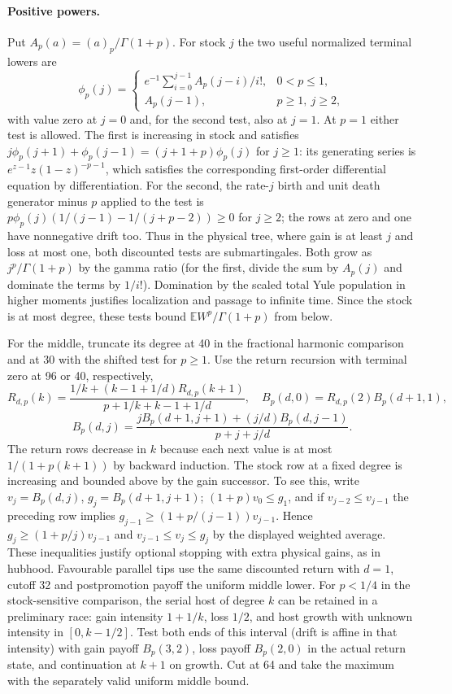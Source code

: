 \documentclass[11pt]{article}
\theoremstyle{remark}
\numberwithin{equation}{section}
\newcommand{\E}{\mathbb E}
\begin{document}
\paragraph{Positive powers.}
Put $A_p(a)=(a)_p/\Gamma(1+p)$. For stock $j$ the two useful normalized terminal lowers are
\[
 \phi_p(j)=\begin{cases}
 e^{-1}\sum_{i=0}^{j-1}A_p(j-i)/i!,&0<p\le1,\\
 A_p(j-1),&p\ge1,\ j\ge2,
 \end{cases}
\]
with value zero at $j=0$ and, for the second test, also at $j=1$. At $p=1$ either test is allowed. The first is increasing in stock and satisfies $j\phi_p(j+1)+\phi_p(j-1)=(j+1+p)\phi_p(j)$ for $j\ge1$: its generating series is $e^{z-1}z(1-z)^{-p-1}$, which satisfies the corresponding first-order differential equation by differentiation. For the second, the rate-$j$ birth and unit death generator minus $p$ applied to the test is $p\phi_p(j)(1/(j-1)-1/(j+p-2))\ge0$ for $j\ge2$; the rows at zero and one have nonnegative drift too. Thus in the physical tree, where gain is at least $j$ and loss at most one, both discounted tests are submartingales. Both grow as $j^p/\Gamma(1+p)$ by the gamma ratio (for the first, divide the sum by $A_p(j)$ and dominate the terms by $1/i!$). Domination by the scaled total Yule population in higher moments justifies localization and passage to infinite time. Since the stock is at most degree, these tests bound $\E W^p/\Gamma(1+p)$ from below.

For the middle, truncate its degree at 40 in the fractional harmonic comparison and at 30 with the shifted test for $p\ge1$. Use the return recursion with terminal zero at 96 or 40, respectively,
\[
 R_{d,p}(k)=\frac{1/k+(k-1+1/d)R_{d,p}(k+1)}{p+1/k+k-1+1/d},\quad
 B_p(d,0)=R_{d,p}(2) B_p(d+1,1),
\]
\[
 B_p(d,j)=\frac{j B_p(d+1,j+1)+(j/d)B_p(d,j-1)}{p+j+j/d}.
\]
The return rows decrease in $k$ because each next value is at most $1/(1+p(k+1))$ by backward induction. The stock row at a fixed degree is increasing and bounded above by the gain successor. To see this, write $v_j=B_p(d,j)$, $g_j=B_p(d+1,j+1)$; $(1+p)v_0\le g_1$, and if $v_{j-2}\le v_{j-1}$ the preceding row implies $g_{j-1}\ge(1+p/(j-1))v_{j-1}$. Hence $g_j\ge(1+p/j)v_{j-1}$ and $v_{j-1}\le v_j\le g_j$ by the displayed weighted average. These inequalities justify optional stopping with extra physical gains, as in hubhood. Favourable parallel tips use the same discounted return with $d=1$, cutoff 32 and postpromotion payoff the uniform middle lower. For $p<1/4$ in the stock-sensitive comparison, the serial host of degree $k$ can be retained in a preliminary race: gain intensity $1+1/k$, loss $1/2$, and host growth with unknown intensity in $[0,k-1/2]$. Test both ends of this interval (drift is affine in that intensity) with gain payoff $B_p(3,2)$, loss payoff $B_p(2,0)$ in the actual return state, and continuation at $k+1$ on growth. Cut at 64 and take the maximum with the separately valid uniform middle bound.
\end{document}
